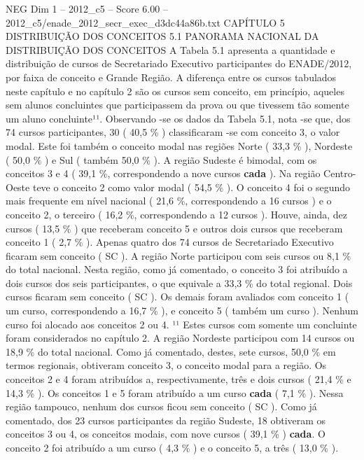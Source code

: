 \begin{textsample}{NEG Dim 1 – 2012\_c5 – Score 6.00 – 2012\_c5/enade\_2012\_secr\_exec\_d3dc44a86b.txt}  \label{ex:f1_neg_330}
CAPÍTULO 5 DISTRIBUIÇÃO DOS CONCEITOS 5.1 PANORAMA NACIONAL DA DISTRIBUIÇÃO DOS CONCEITOS A Tabela 5.1 apresenta a quantidade e distribuição de cursos de Secretariado Executivo participantes do ENADE/2012, por faixa de conceito e Grande Região.
A diferença entre os cursos tabulados neste capítulo e no capítulo 2 são os cursos sem conceito, em princípio, aqueles sem alunos concluintes que participassem da prova ou que tivessem tão somente um aluno concluinte¹¹.
Observando -se os dados da Tabela 5.1, nota -se que, dos 74 cursos participantes, 30 ( 40,5 \% ) classificaram -se com conceito 3, o valor modal.
Este foi também o conceito modal nas regiões Norte ( 33,3 \% ), Nordeste ( 50,0 \% ) e Sul ( também 50,0 \% ).
A região Sudeste é bimodal, com os conceitos 3 e 4 ( 39,1 \%, correspondendo a nove cursos \textbf{cada} ).
Na região Centro-Oeste teve o conceito 2 como valor modal ( 54,5 \% ).
O conceito 4 foi o segundo mais frequente em nível nacional ( 21,6 \%, correspondendo a 16 cursos ) e o conceito 2, o terceiro ( 16,2 \%, correspondendo a 12 cursos ).
Houve, ainda, dez cursos ( 13,5 \% ) que receberam conceito 5 e outros dois cursos que receberam conceito 1 ( 2,7 \% ).
Apenas quatro dos 74 cursos de Secretariado Executivo ficaram sem conceito ( SC ).
A região Norte participou com seis cursos ou 8,1 \% do total nacional.
Nesta região, como já comentado, o conceito 3 foi atribuído a dois cursos dos seis participantes, o que equivale a 33,3 \% do total regional.
Dois cursos ficaram sem conceito ( SC ).
Os demais foram avaliados com conceito 1 ( um curso, correspondendo a 16,7 \% ), e conceito 5 ( também um curso ).
Nenhum curso foi alocado aos conceitos 2 ou 4. ¹¹ Estes cursos com somente um concluinte foram considerados no capítulo 2.
A região Nordeste participou com 14 cursos ou 18,9 \% do total nacional.
Como já comentado, destes, sete cursos, 50,0 \% em termos regionais, obtiveram conceito 3, o conceito modal para a região.
Os conceitos 2 e 4 foram atribuídos a, respectivamente, três e dois cursos ( 21,4 \% e 14,3 \% ).
Os conceitos 1 e 5 foram atribuído a um curso \textbf{cada} ( 7,1 \% ).
Nessa região tampouco, nenhum dos cursos ficou sem conceito ( SC ).
Como já comentado, dos 23 cursos participantes da região Sudeste, 18 obtiveram os conceitos 3 ou 4, os conceitos modais, com nove cursos ( 39,1 \% ) \textbf{cada}.
O conceito 2 foi atribuído a um curso ( 4,3 \% ) e o conceito 5, a três ( 13,0 \% ).

\end{textsample}
